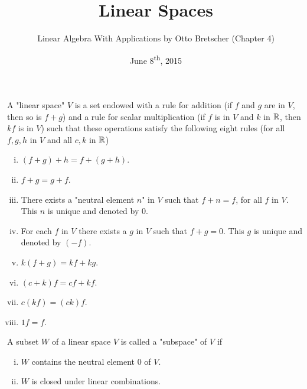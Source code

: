 \documentclass[a4paper,8pt]{article}
\title{Linear Spaces}
\author{Linear Algebra With Applications by Otto Bretscher (Chapter 4)}
\date{June 8\textsuperscript{th}, 2015}
\begin{document}
\maketitle
{}

\begin{outline}


    A "linear space" \(V\) is a set endowed with a rule for addition (if \(f\) and \(g\) are in \(V\), then so is
    \(f + g\)) and a rule for scalar multiplication (if \(f\) is in \(V\) and \(k\) in \(\mathbb{R}\), then \(kf\) is in
    \(V\)) such that these operations satisfy the following eight rules (for all \(f, g, h\) in \(V\) and all
    \(c, k\) in \(\mathbb{R}\))
    \begin{enumerate}[i.]
      \item \((f + g) + h = f+ (g + h)\).
      \item \(f + g = g + f\).
      \item There exists a "neutral element \(n\)" in \(V\) such that \(f + n = f\), for all
            \(f\) in \(V\). This \(n\) is unique and denoted by \(0\).
      \item For each \(f\) in \(V\) there exists a \(g\) in \(V\) such that \(f + g = 0\). This
            \(g\) is unique and denoted by \((-f)\).
      \item \(k(f + g) = kf + kg\).
      \item \((c + k)f = cf + kf\).
      \item \(c(kf) = (ck)f\).
      \item \(1f = f\).
    \end{enumerate}

    A subset \(W\) of a linear space \(V\) is called a "subspace" of \(V\) if
    \begin{enumerate}[i.]
      \item \(W\) contains the neutral element \(0\) of \(V\).
      \item \(W\) is closed under linear combinations.
    \end{enumerate}


\end{outline}
\end{document}

